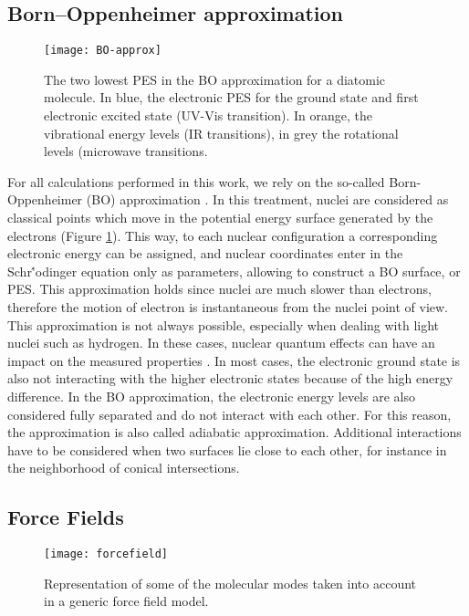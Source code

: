\subsection{Born--Oppenheimer approximation}

\begin{figure}[!htbp]
	\centering
 	\texttt{[image: BO-approx]}
	\caption{The two lowest PES in the BO approximation for a diatomic molecule. In blue, the electronic PES for the ground state and first electronic excited state (UV-Vis transition). In orange, the vibrational energy levels (IR transitions), in grey the rotational levels (microwave transitions.}
	\label{fig:BO-approx}
\end{figure}

For all calculations performed in this work, we rely on the so-called Born-Oppenheimer (BO) approximation \cite{Born1927}. In this treatment, nuclei are considered as classical points which move in the potential energy surface generated by the electrons (Figure \ref{fig:BO-approx}). This way, to each nuclear configuration a corresponding electronic energy can be assigned, and nuclear coordinates enter in the Schr\''odinger equation only as parameters, allowing to construct a BO surface, or PES. This approximation holds since nuclei are much slower than electrons, therefore the motion of electron is instantaneous from the nuclei point of view. 
This approximation is not always possible, especially when dealing with light nuclei such as hydrogen. In these cases, nuclear quantum effects can have an impact on the measured properties \cite{Ceriotti2016}. In most cases, the electronic ground state is also not interacting with the higher electronic states because of the high energy difference. In the BO approximation, the electronic energy levels are also considered fully separated and do not interact with each other. For this reason, the approximation is also called adiabatic approximation. Additional interactions have to be considered when two surfaces lie close to each other, for instance in the neighborhood of conical intersections. 

\subsection{Force Fields}

\begin{figure}[!htbp]
	\centering
 	\texttt{[image: forcefield]}
	\caption{Representation of some of the molecular modes taken into account in a generic force field model.}
	\label{fig:forcefield}
\end{figure}

